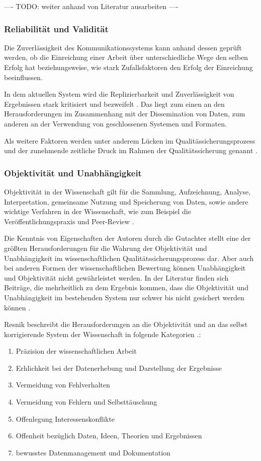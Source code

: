 ---- TODO: weiter anhand von Literatur ausarbeiten ----

\subsubsection{Reliabilität und Validität}

Die Zuverlässigkeit des Kommunikationssystems kann anhand dessen geprüft werden, ob die Einreichung einer Arbeit über unterschiedliche Wege den selben Erfolg hat beziehungsweise, wie stark Zufallsfaktoren den Erfolg der Einreichung beeinflussen.

In dem aktuellen System wird die Replizierbarkeit und Zuverlässigkeit von Ergebnissen stark kritisiert und bezweifelt \cite{Luescher_2014}. Das liegt zum einen an den Herausforderungen im Zusammenhang mit der Dissemination von Daten, zum anderen an der Verwendung von geschlossenen Systemen und Formaten.

Als weitere Faktoren werden unter anderem Lücken im Qualitässicherungsprozess \cite{bar_2009_wissenschaftliche} und der zunehmende zeitliche Druck im Rahmen der Qualitätssicherung genannt \cite{Luescher_2014}.

\subsubsection{Objektivität und Unabhängigkeit}

Objektivität in der Wissenschaft gilt für die Sammlung, Aufzeichnung, Analyse, Interpretation, gemeinsame Nutzung und Speicherung von Daten, sowie andere wichtige Verfahren in der Wissenschaft, wie zum Beispiel die Veröffentlichungspraxis und Peer-Review \cite{resnik_2005_ethics}.

Die Kenntnis von Eigenschaften der Autoren durch die Gutachter stellt eine der größten Herausforderungen für die Wahrung der Objektivität und Unabhängigkeit im wissenschaftlichen Qualitätssicherungsprozess dar. Aber auch bei anderen Formen der wissenschaftlichen Bewertung können Unabhängigkeit und Objektivität nicht gewährleistet werden. In der Literatur finden sich Beiträge, die mehrheitlich zu dem Ergebnis kommen, dass die Objektivität und Unabhängigkeit im bestehenden System nur schwer bis nicht gesichert werden können \cite{binswanger_2014_excellence}.

Resnik beschreibt die Herausforderungen an die Objektivität und an das selbst korrigierende System der Wissenschaft  in folgende Kategorien \cite{resnik_2005_ethics}.:
\begin{enumerate}
\item Präzision der wissenschaftlichen Arbeit
\item Erhlichkeit bei der Datenerhebung und Darstellung der Ergebnisse
\item Vermeidung von Fehlverhalten
\item Vermeidung von Fehlern und Selbsttäuschung
\item Offenlegung Interessenskonflikte
\item Offenheit bezüglich Daten, Ideen, Theorien und  Ergebnissen
\item bewusstes Datenmanagement und Dokumentation
\end{enumerate}

